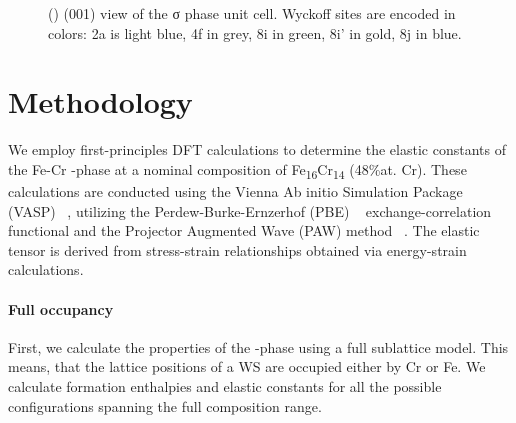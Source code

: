\documentclass[superscriptaddress, 12pt]{revtex4-2}%
\begin{document}
\begin{figure}
  \caption{\protect\label{fig:introduction}
    () (001) view of the σ phase unit cell.
    Wyckoff sites are encoded in colors: 2a is light blue,
    4f in grey, 8i in green, 8i' in gold, 8j in blue.
  }
\end{figure}

\section{Methodology}

We employ first-principles DFT calculations to determine the elastic constants of the Fe-Cr \textsigma-phase at a nominal composition of Fe\textsubscript{16}Cr\textsubscript{14} (48\%at. Cr).
These calculations are conducted using the Vienna Ab initio Simulation Package (VASP) ~\cite{Hafner_vasp}, utilizing the Perdew-Burke-Ernzerhof (PBE) ~\cite{Perdew1996} exchange-correlation functional and the Projector Augmented Wave (PAW) method ~\cite{Bloch1994, kresse_ultrasoft_1999}.
The elastic tensor is derived from stress-strain relationships obtained via energy-strain calculations.


\paragraph{Full occupancy}

First, we calculate the properties of the \textsigma-phase using a full sublattice model.
This means, that the lattice positions of a WS are occupied either by Cr or Fe.
We calculate formation enthalpies and elastic constants for all the possible configurations spanning the full composition range.
\end{document}
